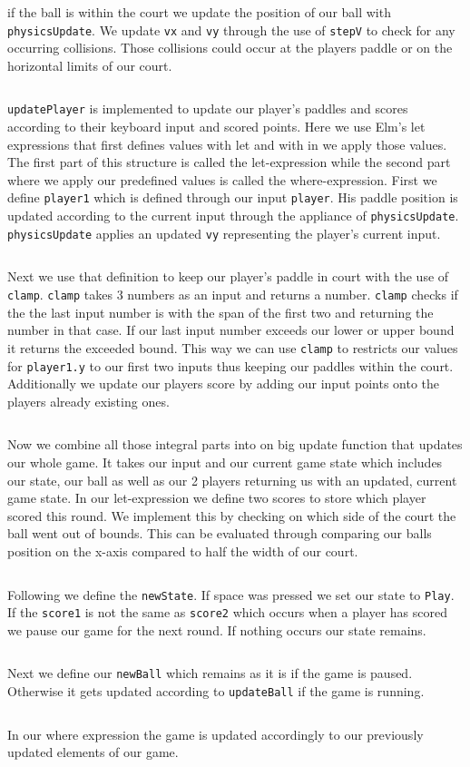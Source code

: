 \documentclass[pdftex,a4paper]{extarticle}
\begin{document}
if the ball is within the court we update the position of our ball with {\tt physicsUpdate}.
We update {\tt vx} and {\tt vy} through the use of {\tt stepV} to check for any occurring collisions.
Those collisions could occur at the players paddle or on the horizontal limits of our court.
\inputminted [breaklines=true] {haskell}{pong(10b).hs}
{\tt updatePlayer} is implemented to update our player's paddles and scores according to their keyboard input and scored points.
Here we use Elm's let expressions that first defines values with let and with in we apply those values. 
The first part of this structure is called the let-expression while the second part where we apply our predefined values is called the where-expression.
First we define {\tt player1} which is defined through our input {\tt player}.
His paddle position is updated according to the current input through the appliance of {\tt physicsUpdate}.
{\tt physicsUpdate} applies an updated {\tt vy} representing the player's current input.
\inputminted [breaklines=true] {haskell}{pong(11a).hs}
Next we use  that definition to keep our player's paddle in court with the use of {\tt clamp}\cite{elm-basics}.
{\tt clamp} takes 3 numbers as an input and returns a number.
{\tt clamp} checks if the the last input number is with the span of the first two and returning the number in that case.
If our last input number exceeds our lower or upper bound it returns the exceeded bound.
This way we can use {\tt clamp} to restricts our values for {\tt player1.y} to our first two inputs thus keeping our paddles within the court.
Additionally we update our players score by adding our input points onto the players already existing ones.
\inputminted [breaklines=true] {haskell}{pong(11b).hs}
Now we combine all those integral parts into on big update function that updates our whole game.
It takes our input and our current game state which includes our state, our ball as well as our 2 players returning us with an updated, current game state.
In our let-expression we define two scores to store which player scored this round.
We implement this by checking on which side of the court the ball went out of bounds.
This can be evaluated through comparing our balls position on the x-axis compared to half the width of our court.
\inputminted [breaklines=true] {haskell}{pong(12a).hs}
Following we define the {\tt newState}.
If space was pressed we set our state to {\tt Play}. 
If the {\tt score1} is not the same as {\tt score2} which occurs when a player has scored we pause our game for the next round.
If nothing occurs our state remains.
\inputminted [breaklines=true] {haskell}{pong(12b).hs}
Next we define our {\tt newBall} which remains as it is if the game is paused.
Otherwise it gets updated according to {\tt updateBall} if the game is running.
\inputminted [breaklines=true] {haskell}{pong(12c).hs}
In our where expression the game is updated accordingly to our previously updated elements of our game.
\inputminted [breaklines=true] {haskell}{pong(12d).hs}
\end{document}
